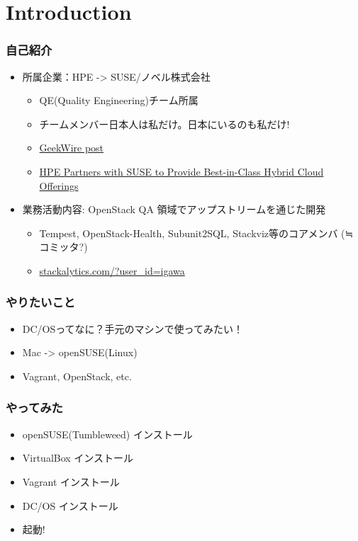 \documentclass[aspectratio=169,11pt,hyperref={colorlinks=true}]{beamer}
\begin{document}
\section{Introduction}
\begin{frame}
  \frametitle{自己紹介}
  \begin{itemize}
    \item 所属企業：HPE -> SUSE/ノベル株式会社
      \begin{itemize}
        \item QE(Quality Engineering)チーム所属
        \item チームメンバー日本人は私だけ。日本にいるのも私だけ!
        \item \href{http://www.geekwire.com/2016/struggling-keep-pace-cloud-hewlett-packard-enterprise-cuts-staff/}{GeekWire post}
        \item \href{https://www.hpe.com/us/en/newsroom/news-archive/statement/2016/11/HPE-Partners-with-SUSE-to-Provide-Best-in-Class-Hybrid-Cloud-Offerings.html}{HPE Partners with SUSE to Provide Best-in-Class Hybrid Cloud Offerings}
      \end{itemize}
    \item 業務活動内容: OpenStack QA 領域でアップストリームを通じた開発
      \begin{itemize}
        \item Tempest, OpenStack-Health, Subunit2SQL, Stackviz等のコアメンバ (≒ コミッタ?)
        \item \href{http://stackalytics.com/?user_id=igawa&release=all&metric=all}{stackalytics.com/?user\_id=igawa}
      \end{itemize}
  \end{itemize}
\end{frame}

\begin{frame}
  \frametitle{やりたいこと}
  \begin{itemize}
    \item DC/OSってなに？手元のマシンで使ってみたい！
    \item Mac -> openSUSE(Linux)
    \item Vagrant, OpenStack, etc.
  \end{itemize}
\end{frame}

\begin{frame}
  \frametitle{やってみた}
  \begin{itemize}
    \item openSUSE(Tumbleweed) インストール
    \item VirtualBox インストール
    \item Vagrant インストール
    \item DC/OS インストール
    \item 起動!
  \end{itemize}
\end{frame}
\end{document}
